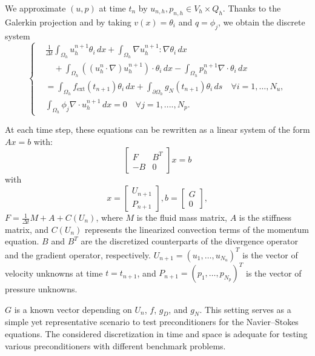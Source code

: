 \documentclass{article}
\begin{document}
We approximate $(u, p)$ at time $t_n$ by $u_{n,h}, p_{n,h} \in V_h \times Q_h$. Thanks to the Galerkin projection and by taking \(v(x) = \theta_i \) and \(q = \phi_j \), we obtain the discrete system
\begin{equation}
\left\{
\begin{aligned}
    &\frac{1}{\Delta t} \int_{\Omega_h} u_h^{n+1} \theta_i \,dx + \int_{\Omega_h} \nabla u_h^{n+1} : \nabla \theta_i \,dx \\
    &\quad+ \int_{\Omega_h} \left((u_h^{n} \cdot \nabla)u_h^{n+1} \right) \cdot \theta_i \,dx - \int_{\Omega_h} p_h^{n+1} \nabla \cdot \theta_i \,dx \\
    &= \int_{\Omega_h} f_{\text{ext}}(t_{n+1}) \theta_i \,dx + \int_{\partial \Omega_h} g_N(t_{n+1}) \theta_i \,ds \quad \forall i = 1, \ldots, N_u, \\
    &\int_{\Omega_h} \phi_j \nabla \cdot u_h^{n+1} \,dx = 0 \quad \forall j = 1, .... , N_p.
\end{aligned}
\right.
\end{equation}

At each time step, these equations can be rewritten as a linear system of the form \(Ax = b\) with:
\[
\begin{bmatrix} F & B^T \\ -B & 0 \end{bmatrix} x =  b
\]
with \[x =\begin{bmatrix} U_{n+1} \\ P_{n+1} \end{bmatrix}, b=\begin{bmatrix} G \\ 0 \end{bmatrix},\]  \( F = \frac{1}{\Delta t} M + A + C(U_n) \), where \( M \) is the fluid mass matrix, \( A \) is the stiffness matrix, and \( C(U_n) \) represents the linearized convection terms of the momentum equation. \( B \) and \( B^T \) are the discretized counterparts of the divergence operator and the gradient operator, respectively. \( U_{n+1} = (u_1, \ldots, u_{N_u})^T \) is the vector of velocity unknowns at time \( t = t_{n+1} \), and \( P_{n+1} = (p_1, \ldots, p_{N_p})^T \) is the vector of pressure unknowns.

\( G \) is a known vector depending on \( U_n \), \( f \), \( g_D \), and \( g_N \). This setting serves as a simple yet representative scenario to test preconditioners for the Navier–Stokes equations. The considered discretization in time and space is adequate for testing various preconditioners with different benchmark problems.
\end{document}
